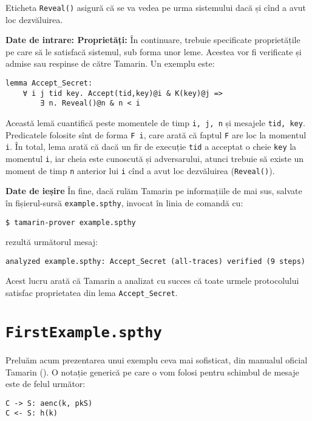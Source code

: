 Eticheta \texttt{Reveal()} asigură că se va vedea pe urma sistemului
dacă și cînd a avut loc dezvăluirea.

\textbf{Date de intrare: Proprietăți:} În continuare, trebuie
specificate proprietățile pe care să le satisfacă sistemul, sub
forma unor leme. Acestea vor fi verificate și admise sau respinse
de către Tamarin. Un exemplu este:

\begin{verbatim}
lemma Accept_Secret:
    ∀ i j tid key. Accept(tid,key)@i & K(key)@j =>
        ∃ n. Reveal()@n & n < i
\end{verbatim}

Această lemă cuantifică peste momentele de timp \texttt{i, j, n} și mesajele
\texttt{tid, key}. Predicatele folosite sînt de forma \texttt{F \@ i}, care
arată că faptul \texttt{F} are loc la momentul \texttt{i}. În total, lema
arată că dacă un fir de execuție \texttt{tid} a acceptat o cheie \texttt{key}
la momentul \texttt{i}, iar cheia este cunoscută și adversarului, atunci
trebuie să existe un moment de timp \texttt{n} anterior lui \texttt{i} cînd
a avut loc dezvăluirea (\texttt{Reveal()}).

\textbf{Date de ieșire} În fine, dacă rulăm Tamarin pe informațiile
de mai sus, salvate în fișierul-sursă \texttt{example.spthy}, invocat în
linia de comandă cu:
\begin{verbatim}
$ tamarin-prover example.spthy
\end{verbatim}
rezultă următorul mesaj:

\begin{verbatim}
analyzed example.spthy: Accept_Secret (all-traces) verified (9 steps)
\end{verbatim}

Acest lucru arată că Tamarin a analizat cu succes că toate urmele protocolului
satisfac proprietatea din lema \texttt{Accept\_Secret}.

\section{\texttt{FirstExample.spthy}}

Preluăm acum prezentarea unui exemplu ceva mai sofisticat, din
manualul oficial Tamarin (\cite{taman}). O notație generică
pe care o vom folosi pentru schimbul de mesaje este de felul
următor:

\begin{verbatim}
C -> S: aenc(k, pkS)
C <- S: h(k)
\end{verbatim}

